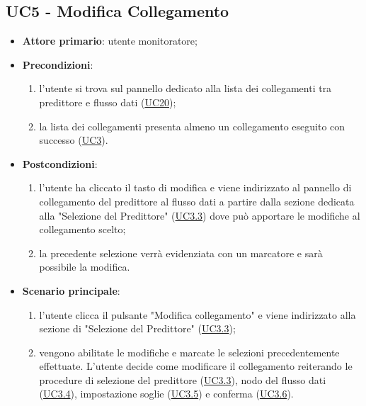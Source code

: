 	\label{par:UC5}
	\subsection{UC5 - Modifica Collegamento}

		\begin{itemize}
			\item\textbf{Attore primario}: utente monitoratore;
			\item\textbf{Precondizioni}: 
				\begin{enumerate}
					\item l'utente si trova sul pannello dedicato alla lista dei collegamenti tra predittore e flusso dati (\hyperref[par:UC20]{UC20});
					\item la lista dei collegamenti presenta almeno un collegamento eseguito con successo (\hyperref[par:UC3]{UC3}).
				\end{enumerate}
			\item\textbf{Postcondizioni}: 
				\begin{enumerate}
					\item l’utente ha cliccato il tasto di modifica e viene indirizzato al pannello di collegamento del predittore al flusso dati a partire dalla sezione dedicata alla "Selezione del Predittore" (\hyperref[par:UC3.3]{UC3.3}) dove può apportare le modifiche al collegamento scelto; 
					\item la precedente selezione verrà evidenziata con un marcatore e sarà possibile la modifica.
				\end{enumerate}
			\item\textbf{Scenario principale}: 
				\begin{enumerate} 
					\item l'utente clicca il pulsante "Modifica collegamento" e viene indirizzato alla sezione di "Selezione del Predittore" (\hyperref[par:UC3.3]{UC3.3});  
					\item vengono abilitate le modifiche e marcate le selezioni precedentemente effettuate. L'utente decide come modificare il collegamento reiterando le procedure di selezione del predittore (\hyperref[par:UC3.3]{UC3.3}), nodo del flusso dati (\hyperref[par:UC3.4]{UC3.4}), impostazione soglie (\hyperref[par:UC3.5]{UC3.5}) e conferma (\hyperref[par:UC3.6]{UC3.6}). 
				\end{enumerate}		
		\end{itemize}



	\label{par:UC6}
